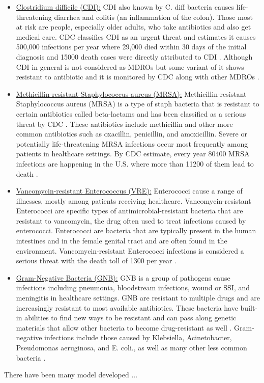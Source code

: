 \begin{itemize}
	\item \underline{Clostridium difficile (CDI):} CDI also known by C. diff bacteria causes life-threatening diarrhea and colitis (an inflammation of the colon). 
	Those most at risk are people, especially older adults, who take antibiotics and also get medical care. CDC classifies CDI as an urgent threat and estimates it causes 500,000 infections per year where 29,000 died within 30 days of the initial diagnosis and 15000 death cases were directly attributed to CDI \cite{resistance}. Although CDI in general is not considered as MDROs but some variant of it shows resistant to antibiotic  \cite{tenover2012antimicrobial, spigaglia2016recent} and it is monitored by CDC along with other MDROs \cite{cdimdro}. 
	\item \underline{Methicillin-resistant Staphylococcus aureus (MRSA):}  Methicillin-resistant Staphylococcus aureus (MRSA) is a type of staph bacteria that is resistant to certain antibiotics called beta-lactams and has been classified as a serious threat by CDC \cite{resistance}. These antibiotics include methicillin and other more common antibiotics such as oxacillin, penicillin, and amoxicillin. Severe or potentially life-threatening MRSA infections occur most frequently among patients in healthcare settings. By CDC estimate, every year 80400 MRSA infections are happening in the U.S. where more than 11200 of them lead to death \cite{resistance}. 
	\item \underline{Vancomycin-resistant Enterococcus (VRE):} Enterococci cause a range of illnesses, mostly among patients receiving healthcare. Vancomycin-resistant Enterococci are specific types of antimicrobial-resistant bacteria that are resistant to vancomycin, the drug often used to treat infections caused by enterococci. Enterococci are bacteria that are typically present in the human intestines and in the female genital tract and are often found in the environment. Vancomycin-resistant Enterococci infections is considered a serious threat with the death toll of 1300 per year \cite{resistance}.
	\item \underline{Gram-Negative Bacteria (GNB):} GNB is a group of pathogens cause infections including pneumonia, bloodstream infections, wound or SSI, and meningitis in healthcare settings. GNB are resistant to multiple drugs and are increasingly resistant to most available antibiotics. These bacteria have built-in abilities to find new ways to be resistant and can pass along genetic materials that allow other bacteria to become drug-resistant as well \cite{resistance}. Gram-negative infections include those caused by Klebsiella, Acinetobacter, Pseudomonas aeruginosa, and E. coli., as well as many other less common bacteria \cite{gnb}.  
\end{itemize}
There have been many model developed ... 


